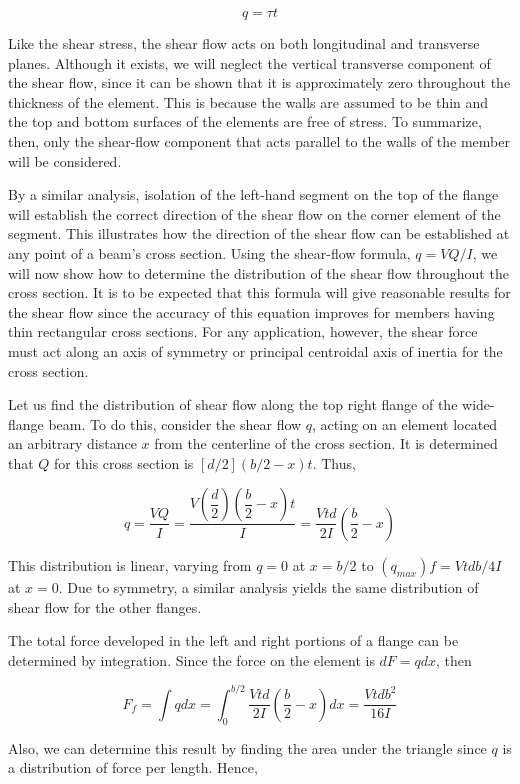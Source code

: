\documentclass[
10pt,
a4paper,
openany,
svgnames,
]{kaobook} %
\begin{document}
\[q = \tau t\]

Like the shear stress, the shear flow acts on both longitudinal and transverse planes. Although it exists, we will neglect the vertical transverse component of the shear flow, since it can be shown that it is approximately zero throughout the thickness of the element. This is because the walls are assumed to be thin and the top and bottom surfaces of the elements are free of stress. To summarize, then, only the shear-flow component that acts parallel to the walls of the member will be considered.

By a similar analysis, isolation of the left-hand segment on the top of the flange will establish the correct direction of the shear flow on the corner element of the segment. This illustrates how the direction of the shear flow can be established at any point of a beam’s cross section. Using the shear-flow formula, $q = VQ/I$, we will now show how to determine the distribution of the shear flow throughout the cross section. It is to be expected that this formula will give reasonable results for the shear flow since the accuracy of this equation improves for members having thin rectangular cross sections. For any application, however, the shear force must act along an axis of symmetry or principal centroidal axis of inertia for the cross section.

Let us find the distribution of shear flow along the top right flange of the wide-flange beam. To do this, consider the shear flow $q$, acting on an element located an arbitrary distance $x$ from the centerline of the cross section. It is determined that $Q$ for this cross section is $[d/2](b/2 - x)t$. Thus,

\[q = \frac{VQ}{I} = \frac{V \left( \dfrac{d}{2} \right)\left( \dfrac{b}{2} - x \right)t}{I} = \frac{Vtd}{2I}\left( \frac{b}{2} - x \right)\]

This distribution is linear, varying from $q = 0$ at $x = b/2$ to $(q_{max})f = Vtdb/4I$ at $x = 0$. Due to symmetry, a similar analysis yields the same distribution of shear flow for the other flanges.

The total force developed in the left and right portions of a flange can be determined by integration. Since the force on the element is $dF = qdx$, then

\[F_f = \int qdx  = \int_0^{b/2} \frac{Vtd}{2I}\left( \frac{b}{2} - x \right)dx  = \frac{Vtdb^2}{16I}\]

Also, we can determine this result by finding the area under the triangle since $q$ is a distribution of force per length. Hence,
\end{document}
